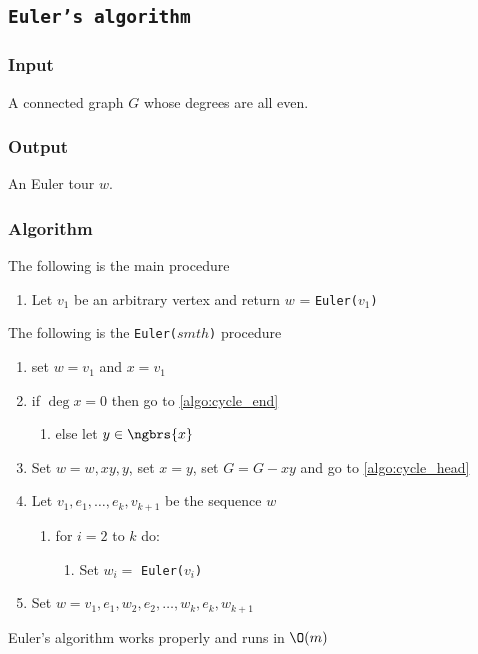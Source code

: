 \subsection{\texttt{Euler's algorithm}}
\subsubsection{Input}
    A connected graph $G$ whose degrees are all even.
\subsubsection{Output}
    An Euler tour $w$.
\subsubsection{Algorithm}
The following is the main procedure
\begin{enumerate}
    \item Let $v_1$ be an arbitrary vertex and return $w$ = \texttt{Euler($v_1$)}
\end{enumerate}
The following is the \texttt{Euler($smth$)} procedure
\begin{enumerate}
    \item set $w = v_1$ and $x = v_1$
    \item \label{algo:cycle_head} if $\deg{x} = 0$ then go to \ref{algo:cycle_end}
    \begin{enumerate}
        \item else let $y \in \ngbrs{x}$
    \end{enumerate}
    \item Set $w = w, xy, y$, set $x = y$, set $G = G - xy$ and go to \ref{algo:cycle_head}
    \item \label{algo:cycle_end} Let $v_1, e_1, \dots, e_k, v_{k + 1}$ be the sequence $w$
    \begin{enumerate}
        \item for $i = 2$ to $k$ do:
        \begin{enumerate}
            \item Set $w_i =$ \texttt{Euler($v_i$)}
        \end{enumerate}
    \end{enumerate}
    \item Set $w = v_1, e_1, w_2, e_2, \dots, w_k, e_k, w_{k + 1}$
\end{enumerate}
\begin{customtheorem}{1.29}
\label{theorem:1.29}
    Euler's algorithm works properly and runs in $\O(m)$
\end{customtheorem}
